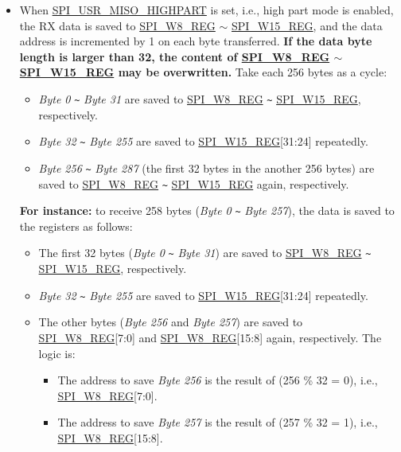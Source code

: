 \documentclass[main\_\_EN.tex]{subfiles}
\begin{document}
\begin{itemize}
\begin{itemize}
        \item When \hyperref[fielddesc:SPIUSRMISOHIGHPART]{SPI\_USR\_MISO\_HIGHPART} is set, i.e., high part mode is enabled, the RX data is saved to \hyperref[regdesc:SPIW0REG]{SPI\_W8\_REG} $\sim$ \hyperref[regdesc:SPIW0REG]{SPI\_W15\_REG}, and the data address is incremented by 1 on each byte transferred. \textbf{If the data byte length is larger than 32, the content of \hyperref[regdesc:SPIW0REG]{SPI\_W8\_REG} $\sim$ \hyperref[regdesc:SPIW0REG]{SPI\_W15\_REG} may be overwritten.} Take each 256 bytes as a cycle:
        \begin{itemize}
            \item \emph{Byte 0} \verb+~+ \emph{Byte 31} are saved to \hyperref[regdesc:SPIW0REG]{SPI\_W8\_REG} \verb+~+ \hyperref[regdesc:SPIW0REG]{SPI\_W15\_REG}, respectively.
            \item \emph{Byte 32} \verb+~+ \emph{Byte 255} are saved to \hyperref[regdesc:SPIW0REG]{SPI\_W15\_REG}[31:24] repeatedly.
            \item \emph{Byte 256} \verb+~+ \emph{Byte 287} (the first 32 bytes in the another 256 bytes) are saved to \hyperref[regdesc:SPIW0REG]{SPI\_W8\_REG} \verb+~+ \hyperref[regdesc:SPIW0REG]{SPI\_W15\_REG} again, respectively.
        \end{itemize}
        
        \textbf{For instance:} to receive 258 bytes (\emph{Byte 0} \verb+~+ \emph{Byte 257}), the data is saved to the registers as follows:
        \begin{itemize}
            \item The first 32 bytes (\emph{Byte 0} \verb+~+ \emph{Byte 31}) are saved to \hyperref[regdesc:SPIW0REG]{SPI\_W8\_REG} \verb+~+ \hyperref[regdesc:SPIW0REG]{SPI\_W15\_REG}, respectively.
            \item \emph{Byte 32} \verb+~+ \emph{Byte 255} are saved to \hyperref[regdesc:SPIW0REG]{SPI\_W15\_REG}[31:24] repeatedly. 
            \item The other bytes (\emph{Byte 256} and \emph{Byte 257}) are saved to \hyperref[regdesc:SPIW0REG]{SPI\_W8\_REG}[7:0] and \hyperref[regdesc:SPIW0REG]{SPI\_W8\_REG}[15:8] again, respectively. The logic is:
            \begin{itemize}
                \item The address to save \emph{Byte 256} is the result of (256 \% 32 = 0), i.e., \hyperref[regdesc:SPIW0REG]{SPI\_W8\_REG}[7:0].
                \item The address to save \emph{Byte 257} is the result of (257 \% 32 = 1), i.e., \hyperref[regdesc:SPIW0REG]{SPI\_W8\_REG}[15:8].
            \end{itemize}
        \end{itemize}
    \end{itemize}
\end{itemize}
\end{document}
